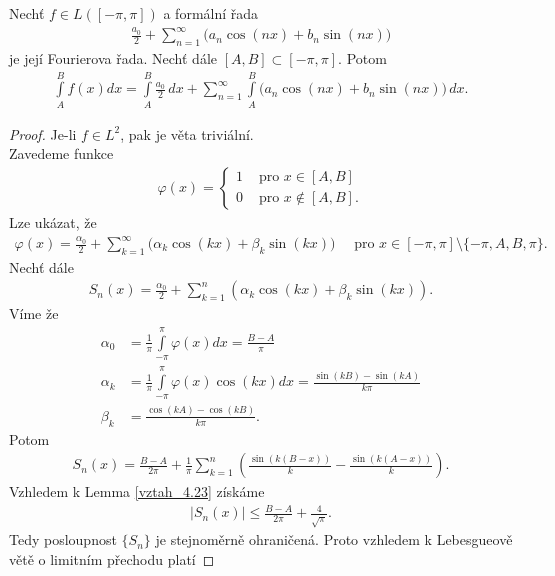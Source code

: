 \begin{theorem}\label{v_4.25}
Nechť $f \in L([-\pi, \pi])$ a formální řada
\begin{align*}
\frac{a_0}{2} + \sum \limits _{n=1}^\infty \Big(a_n \cos (nx) + b_n \sin (nx)\Big)
\end{align*}
je její Fourierova řada. Nechť dále $[A, B] \subset [-\pi, \pi]$. Potom
\begin{align*}
\int \limits_A^B f(x) dx = \int \limits_A^B \frac{a_0}{2} \,dx + \sum \limits _{n=1}^{\infty}\int \limits_A^B \Big(a_n \cos (nx) + b_n \sin (nx)\Big) \,dx.
\end{align*}
\begin{proof}
Je-li $f \in L^2$, pak je věta triviální.\\
Zavedeme funkce
\begin{align*}
\varphi (x) = \left\{
\begin{array}{cl}
1 & \textrm{ pro } x \in [A, B]\\
0 & \textrm{ pro } x \notin [A, B].
\end{array}
\right.
\end{align*}
Lze ukázat, že
\begin{align*}
\varphi (x) = \frac{\alpha_0}{2} + \sum \limits _{k=1}^\infty \Big(\alpha_k \cos (kx) + \beta_k \sin (kx)\Big) \quad \textrm{ pro } x \in [-\pi, \pi] \setminus \{ -\pi, A, B, \pi \}.
\end{align*}
Nechť dále
\begin{align*}
S_n (x) = \frac{\alpha_0}{2} + \sum \limits _{k=1}^n (\alpha_k \cos (kx) + \beta_k \sin (kx)).
\end{align*}
Víme že
\begin{align*}
\alpha_0 &= \frac{1}{\pi} \int \limits_{-\pi}^\pi \varphi(x) dx = \frac{B-A}{\pi}\\
\alpha_k &= \frac{1}{\pi} \int \limits_{-\pi}^\pi \varphi (x) \cos (kx) dx = \frac{\sin (kB) - \sin (kA)}{k \pi}\\
\beta_k &= \frac{\cos (kA) - \cos (kB)}{k \pi}.
\end{align*}
Potom
\begin{align*}
S_n (x) = \frac{B-A}{2 \pi} + \frac{1}{\pi} \sum \limits _{k=1}^n \left( \frac{\sin (k(B-x))}{k} - \frac{\sin(k(A-x))}{k} \right).
\end{align*}
Vzhledem k Lemma \eqref{vztah_4.23} získáme
\begin{align*}
|S_n (x)| \leq \frac{B-A}{2 \pi} + \frac{4}{\sqrt{\pi}}.
\end{align*}
Tedy posloupnost $\{ S_n \}$ je stejnoměrně ohraničená. Proto vzhledem k Lebesgueově větě o limitním přechodu platí

\end{proof}
\end{theorem}
